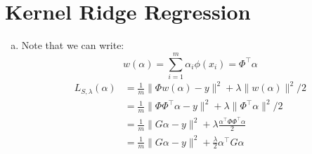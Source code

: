\documentclass{amsart}
\theoremstyle{definition}
\begin{document}
\section{Kernel Ridge Regression}
\begin{enumerate}[(a)]
  \item 
    Note that we can write:
    \[
      w(\alpha) = \displaystyle\sum_{i = 1}^{m }\alpha_i \phi(x_i) = \Phi^\intercal \alpha
    \]
    \begin{align*}
      L_{S, \lambda}(\alpha) &= \displaystyle\frac{1}{m } \| \Phi w(\alpha) - y\|^2 + \lambda \|w(\alpha)\|^2/2\\
                             &= \frac1{m} \| \Phi \Phi^\intercal \alpha - y\|^2 + \lambda \|\Phi^\intercal \alpha\|^2/2 \\
                             &= \frac1{m} \| G\alpha - y\|^2 + \lambda \frac{\alpha^\intercal \Phi \Phi^\intercal \alpha}{2}\\
                             &= \frac1{m} \|G\alpha - y\|^2 + \displaystyle\frac{\lambda }{2}\alpha^\intercal G \alpha 
    \end{align*}
\end{enumerate}
\end{document}
